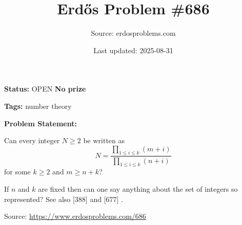 \documentclass{article}
\title{Erd\H{o}s Problem \#686}
\date{Last updated: 2025-08-31}
\author{Source: erdosproblems.com}
\begin{document}
\maketitle

\noindent\textbf{Status:} OPEN \quad \textbf{No prize}

\noindent\textbf{Tags:} number theory

\medskip

\noindent\textbf{Problem Statement:}

Can every integer $N\geq 2$ be written as\[N=\frac{\prod_{1\leq i\leq k}(m+i)}{\prod_{1\leq i\leq k}(n+i)}\]for some $k\geq 2$ and $m\geq n+k$?




If $n$ and $k$ are fixed then can one say anything about the set of integers so represented? See also [388] and [677] .


\bigskip
\noindent\small{Source: \url{https://www.erdosproblems.com/686}}
\end{document}
